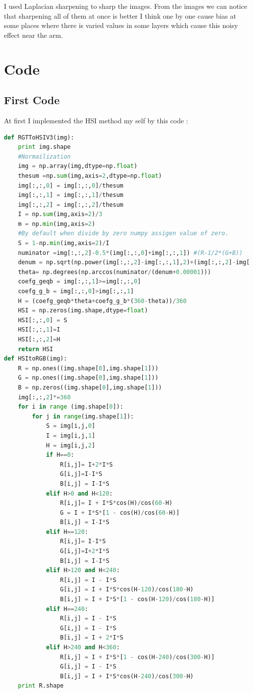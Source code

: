\documentclass{article}
\begin{document}
I used Laplacian sharpening to sharp the images. From the images we can notice that sharpening all of them at once is better I think one by one cause bias at some places where there is varied values in some layers which cause this noisy effect near the arm.
\section*{Code}
\subsection*{First Code}
At first I implemented the HSI method my self by this code :
\begin{lstlisting}[language=Python]
def RGTToHSIV3(img):
    print img.shape
    #Normailization
    img = np.array(img,dtype=np.float)
    thesum =np.sum(img,axis=2,dtype=np.float)
    img[:,:,0] = img[:,:,0]/thesum
    img[:,:,1] = img[:,:,1]/thesum
    img[:,:,2] = img[:,:,2]/thesum
    I = np.sum(img,axis=2)/3
    m = np.min(img,axis=2)
    #By default when divide by zero numpy assigen value of zero.
    S = 1-np.min(img,axis=2)/I
    numinator =img[:,:,2]-0.5*(img[:,:,0]+img[:,:,1]) #(R-1/2*(G+B))
    denum = np.sqrt(np.power(img[:,:,2]-img[:,:,1],2)+(img[:,:,2]-img[:,:,0])*(img[:,:,1]-img[:,:,0]))
    theta= np.degrees(np.arccos(numinator/(denum+0.00001)))
    coefg_geqb = img[:,:,1]>=img[:,:,0]
    coefg_g_b = img[:,:,0]>img[:,:,1]
    H = (coefg_geqb*theta+coefg_g_b*(360-theta))/360
    HSI = np.zeros(img.shape,dtype=float)
    HSI[:,:,0] = S
    HSI[:,:,1]=I
    HSI[:,:,2]=H
    return HSI
def HSItoRGB(img):
    R = np.ones((img.shape[0],img.shape[1]))
    G = np.ones((img.shape[0],img.shape[1]))
    B = np.zeros((img.shape[0],img.shape[1]))
    img[:,:,2]*=360
    for i in range (img.shape[0]):
        for j in range(img.shape[1]):
            S = img[i,j,0]
            I = img[i,j,1]
            H = img[i,j,2]
            if H==0:
                R[i,j]= I+2*I*S
                G[i,j]=I-I*S
                B[i,j] = I-I*S
            elif H>0 and H<120:
                R[i,j]= I + I*S*cos(H)/cos(60-H)
                G = I + I*S*[1 - cos(H)/cos(60-H)]
                B[i,j] = I-I*S
            elif H==120:
                R[i,j]= I-I*S
                G[i,j]=I+2*I*S
                B[i,j] = I-I*S
            elif H>120 and H<240:
                R[i,j] = I - I*S
                G[i,j] = I + I*S*cos(H-120)/cos(180-H)
                B[i,j] = I + I*S*[1 - cos(H-120)/cos(180-H)]
            elif H==240:
                R[i,j] = I - I*S
                G[i,j] = I - I*S
                B[i,j] = I + 2*I*S
            elif H>240 and H<360:
                R[i,j] = I + I*S*[1 - cos(H-240)/cos(300-H)]
                G[i,j] = I - I*S
                B[i,j] = I + I*S*cos(H-240)/cos(300-H)
    print R.shape
\end{lstlisting}
\end{document}
